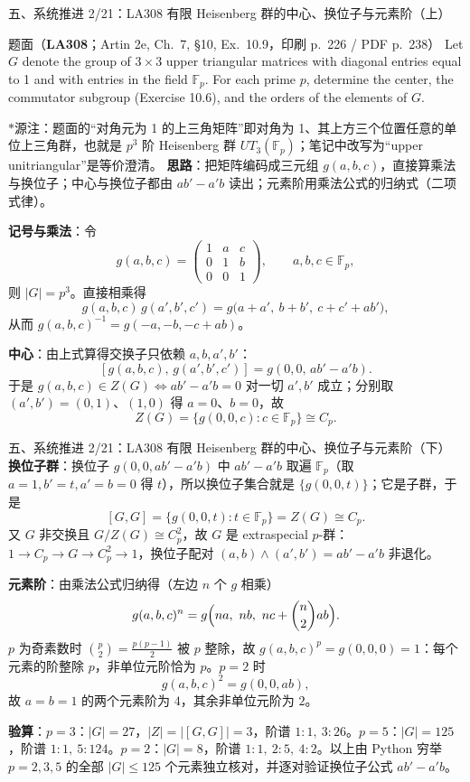 \documentclass[aspectratio=169,10pt,fontset=none]{ctexbeamer}
\newcommand{\ex}[1]{\textcolor{accent}{\footnotesize\bfseries #1}}
\newcommand{\key}[1]{\textcolor{ink}{\bfseries #1}}
\newcommand{\starpt}{\textcolor{accent}{\bfseries$\ast$}}
\begin{document}
\begin{frame}[t]{五、系统推进 2/21：LA308 有限 Heisenberg 群的中心、换位子与元素阶（上）}
\label{ex:LA308}
\scriptsize
\begin{block}{\footnotesize 题面（\ex{LA308}；Artin 2e, Ch.~7, §10, Ex.~10.9，印刷 p.~226 / PDF p.~238）}
Let $G$ denote the group of $3\times3$ upper triangular matrices with diagonal entries equal to 1 and with entries in the field $\mathbb F_p$. For each prime $p$, determine the center, the commutator subgroup (Exercise 10.6), and the orders of the elements of $G$.
\end{block}
\starpt 源注：题面的“对角元为 1 的上三角矩阵”即对角为 1、其上方三个位置任意的单位上三角群，也就是 $p^3$ 阶 Heisenberg 群 $UT_3(\mathbb F_p)$；笔记中改写为“upper unitriangular”是等价澄清。
\key{思路}：把矩阵编码成三元组 $g(a,b,c)$，直接算乘法与换位子；中心与换位子都由 $ab'-a'b$ 读出；元素阶用乘法公式的归纳式（二项式律）。

\key{记号与乘法}：令
\[ g(a,b,c)=\begin{pmatrix}1&a&c\\0&1&b\\0&0&1\end{pmatrix},\qquad a,b,c\in\mathbb F_p, \]
则 $|G|=p^3$。直接相乘得
\[ g(a,b,c)\,g(a',b',c')=g\bigl(a+a',\ b+b',\ c+c'+ab'\bigr), \]
从而 $g(a,b,c)^{-1}=g(-a,-b,-c+ab)$。

\key{中心}：由上式算得交换子只依赖 $a,b,a',b'$：
\[ [g(a,b,c),\,g(a',b',c')]=g(0,0,\,ab'-a'b). \]
于是 $g(a,b,c)\in Z(G)\iff ab'-a'b=0$ 对一切 $a',b'$ 成立；分别取 $(a',b')=(0,1)$、$(1,0)$ 得 $a=0$、$b=0$，故
\[ Z(G)=\{g(0,0,c):c\in\mathbb F_p\}\cong C_p. \]
\end{frame}

\begin{frame}[t]{五、系统推进 2/21：LA308 有限 Heisenberg 群的中心、换位子与元素阶（下）}
\scriptsize
\key{换位子群}：换位子 $g(0,0,ab'-a'b)$ 中 $ab'-a'b$ 取遍 $\mathbb F_p$（取 $a=1,b'=t,a'=b=0$ 得 $t$），所以换位子集合就是 $\{g(0,0,t)\}$；它是子群，于是
\[ [G,G]=\{g(0,0,t):t\in\mathbb F_p\}=Z(G)\cong C_p. \]
又 $G$ 非交换且 $G/Z(G)\cong C_p^2$，故 $G$ 是 extraspecial $p$-群：$1\to C_p\to G\to C_p^2\to1$，换位子配对 $(a,b)\wedge(a',b')=ab'-a'b$ 非退化。

\key{元素阶}：由乘法公式归纳得（左边 $n$ 个 $g$ 相乘）
\[ g(a,b,c)^n=g\Bigl(na,\ nb,\ nc+\binom n2 ab\Bigr). \]
$p$ 为奇素数时 $\binom p2=\frac{p(p-1)}2$ 被 $p$ 整除，故 $g(a,b,c)^p=g(0,0,0)=1$：每个元素的阶整除 $p$，非单位元阶恰为 $p$。$p=2$ 时
\[ g(a,b,c)^2=g(0,0,ab), \]
故 $a=b=1$ 的两个元素阶为 $4$，其余非单位元阶为 $2$。

\key{验算}：$p=3$：$|G|=27$，$|Z|=|[G,G]|=3$，阶谱 $1\!:\!1,\ 3\!:\!26$。$p=5$：$|G|=125$，阶谱 $1\!:\!1,\ 5\!:\!124$。$p=2$：$|G|=8$，阶谱 $1\!:\!1,\ 2\!:\!5,\ 4\!:\!2$。以上由 Python 穷举 $p=2,3,5$ 的全部 $|G|\le125$ 个元素独立核对，并逐对验证换位子公式 $ab'-a'b$。
\end{frame}
\end{document}
